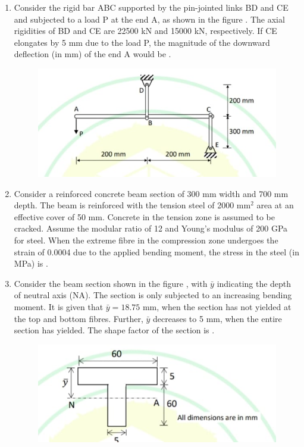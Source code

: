 \documentclass[journal,12pt,onecolumn]{article}
\theoremstyle{remark}
\begin{document}
\begin{enumerate}
\item Consider the rigid bar ABC supported by the pin-jointed links BD and CE and subjected to a load P at the end A, as shown in the figure . The axial rigidities of BD and CE are 22500 kN and 15000 kN, respectively. If CE elongates by 5 mm due to the load P, the magnitude of the downward deflection (in mm) of the end A would be \underline{\hspace{2cm}} .
\begin{figure}[H]
    \centering
    \includegraphics[width=0.7\columnwidth]{figs/1q-51.jpg}
    \caption{}
    \label{fig:q51}
\end{figure}

\hfill{}

\item Consider a reinforced concrete beam section of 300 mm width and 700 mm depth. The beam is reinforced with the tension steel of 2000 mm$^2$ area at an effective cover of 50 mm. Concrete in the tension zone is assumed to be cracked. Assume the modular ratio of 12 and Young's modulus of 200 GPa for steel. When the extreme fibre in the compression zone undergoes the strain of 0.0004 due to the applied bending moment, the stress in the steel (in MPa) is \underline{\hspace{2cm}} .

\hfill{}

\item Consider the beam section shown in the figure , with $\bar{y}$ indicating the depth of neutral axis (NA). The section is only subjected to an increasing bending moment. It is given that $\bar{y} = 18.75$ mm, when the section has not yielded at the top and bottom fibres. Further, $\bar{y}$ decreases to 5 mm, when the entire section has yielded. The shape factor of the section is \underline{\hspace{2cm}} .
\begin{figure}[H]
    \centering
    \includegraphics[width=0.7\columnwidth]{figs/1q-53.jpg}
    \caption{}
    \label{fig:q53}
\end{figure}


\end{enumerate}
\end{document}
